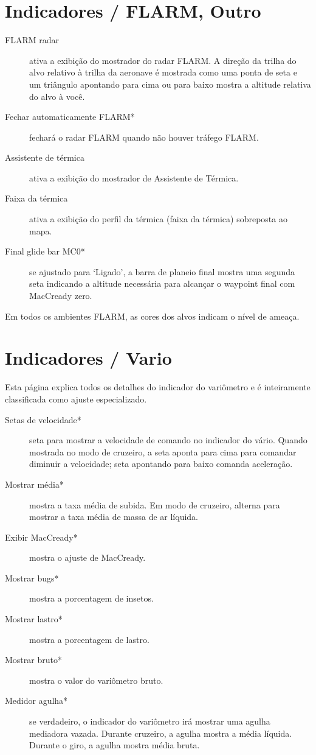 \section{Indicadores / FLARM, Outro} \label{sec:flarmandother-gauge}

\begin{description}
\item[FLARM radar]  \label{conf:flarmdisplay} ativa a exibição do mostrador do radar FLARM.  A direção da trilha do alvo relativo à trilha da aeronave é mostrada como uma ponta de seta e um triângulo apontando para cima ou para baixo mostra a altitude relativa do alvo à você.
\\
\item[Fechar automaticamente FLARM*]  fechará o radar FLARM quando não houver tráfego FLARM.
\item[Assistente de térmica] \label{conf:thermalassistant} ativa a exibição do mostrador de Assistente de Térmica.
\item[Faixa da térmica] \label{conf:thermalband} ativa a exibição do perfil da térmica (faixa da térmica) sobreposta ao mapa.
\item[Final glide bar MC0*]  se ajustado para ‘Ligado’, a barra de planeio final mostra uma segunda seta indicando a altitude necessária para alcançar o waypoint final com MacCready zero.
\end{description}
Em todos os ambientes FLARM, as cores dos alvos indicam o nível de ameaça.

\section{Indicadores / Vario}\label{sec:vario-gauge}

Esta página explica todos os detalhes do indicador do variômetro e é inteiramente classificada como ajuste especializado.

\begin{description}
\item[Setas de velocidade*]  \label{conf:variogauge} seta para mostrar a velocidade de comando no indicador do vário.  Quando mostrada no modo de cruzeiro, a seta aponta para cima para comandar diminuir a velocidade; seta apontando para baixo comanda aceleração.
\item[Mostrar média*]  mostra a taxa média de subida.  Em modo de cruzeiro, alterna para mostrar a taxa média de massa de ar líquida.
\item[Exibir MacCready*]  mostra o ajuste de MacCready.
\item[Mostrar  bugs*]  mostra a porcentagem de insetos.
\item[Mostrar lastro*] mostra a porcentagem de lastro.
\item[Mostrar bruto*]  mostra o valor do variômetro bruto.
\item[Medidor agulha*] se verdadeiro, o indicador do variômetro irá mostrar uma agulha mediadora vazada.  
Durante cruzeiro, a agulha mostra a média líquida.
Durante o giro, a agulha mostra média bruta.

\end{description}

